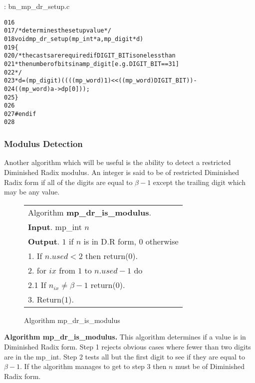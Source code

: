 \documentclass[b5paper]{book}
\begin{document}
\vspace{+3mm}\begin{small}
\hspace{-5.1mm}{\bf File}: bn\_mp\_dr\_setup.c
\vspace{-3mm}
\begin{alltt}
016   
017   /* determines the setup value */
018   void mp_dr_setup(mp_int *a, mp_digit *d)
019   \{
020      /* the casts are required if DIGIT_BIT is one less than
021       * the number of bits in a mp_digit [e.g. DIGIT_BIT==31]
022       */
023      *d = (mp_digit)((((mp_word)1) << ((mp_word)DIGIT_BIT)) - 
024           ((mp_word)a->dp[0]));
025   \}
026   
027   #endif
028   
\end{alltt}
\end{small}

\subsubsection{Modulus Detection}
Another algorithm which will be useful is the ability to detect a restricted Diminished Radix modulus.  An integer is said to be
of restricted Diminished Radix form if all of the digits are equal to $\beta - 1$ except the trailing digit which may be any value.

\begin{figure}[!here]
\begin{small}
\begin{center}
\begin{tabular}{l}
\hline Algorithm \textbf{mp\_dr\_is\_modulus}. \\
\textbf{Input}.   mp\_int $n$ \\
\textbf{Output}.  $1$ if $n$ is in D.R form, $0$ otherwise \\
\hline
1.  If $n.used < 2$ then return($0$). \\
2.  for $ix$ from $1$ to $n.used - 1$ do \\
\hspace{3mm}2.1  If $n_{ix} \ne \beta - 1$ return($0$). \\
3.  Return($1$). \\
\hline
\end{tabular}
\end{center}
\end{small}
\caption{Algorithm mp\_dr\_is\_modulus}
\end{figure}

\textbf{Algorithm mp\_dr\_is\_modulus.}
This algorithm determines if a value is in Diminished Radix form.  Step 1 rejects obvious cases where fewer than two digits are
in the mp\_int.  Step 2 tests all but the first digit to see if they are equal to $\beta - 1$.  If the algorithm manages to get to
step 3 then $n$ must be of Diminished Radix form.
\end{document}
